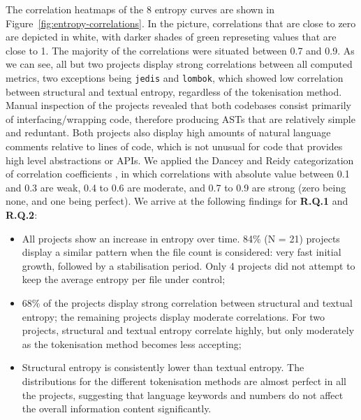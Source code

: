 \documentclass[10pt,conference]{IEEEtran}
\begin{document}
The correlation heatmaps of the 8 entropy curves are shown in Figure~\ref{fig:entropy-correlations}. In the picture, correlations that are close to zero are depicted in white, with darker shades of green represeting values that are close to 1. The majority of the correlations were situated between 0.7 and 0.9. As we can see, all but two projects display strong correlations between all computed metrics, two exceptions being \texttt{jedis} and \texttt{lombok}, which showed low correlation between structural and textual entropy, regardless of the tokenisation method. Manual inspection of the projects revealed that both codebases consist primarily of interfacing/wrapping code, therefore producing ASTs that are relatively simple and reduntant. Both projects also display high  amounts of natural language comments relative to lines of code, which is not unusual for code that provides high level abstractions or APIs. We applied the Dancey and Reidy categorization of correlation coefficients \cite{akoglu2018coefficients}, in which correlations with absolute value between 0.1 and 0.3 are weak, 0.4 to 0.6 are moderate, and 0.7 to 0.9 are strong (zero being none, and one being perfect). We arrive at the following findings for \textbf{R.Q.1} and \textbf{R.Q.2}:
\begin{itemize}
    \item All projects show an increase in entropy over time. 84\% (N = 21) projects display a similar pattern when the file count is considered: very fast initial growth, followed by a stabilisation period. Only 4 projects did not attempt to keep the average entropy per file under control;
    \item 68\% of the projects display strong correlation between structural and textual entropy; the remaining projects display moderate correlations. For two projects, structural and textual entropy correlate highly, but only moderately as the tokenisation method becomes less accepting;
    \item Structural entropy is consistently lower than textual entropy. The distributions for the different tokenisation methods are almost perfect in all the projects, suggesting that language keywords and numbers do not affect the overall information content significantly.
\end{itemize}

\def \heatmapWidth {16mm}
\end{document}
